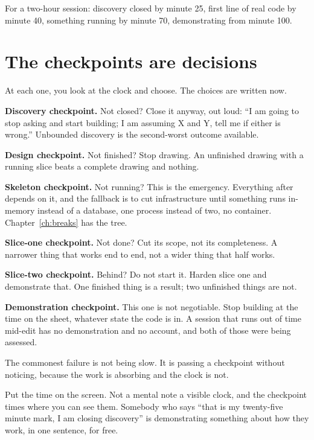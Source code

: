For a two-hour session: discovery closed by minute 25, first line of real code
by minute 40, something running by minute 70, demonstrating from minute 100.

\section{The checkpoints are decisions}

At each one, you look at the clock and choose. The choices are written now.

\begin{kitmethod}
\textbf{Discovery checkpoint.} Not closed? Close it anyway, out loud: ``I am
going to stop asking and start building; I am assuming X and Y, tell me if
either is wrong.'' Unbounded discovery is the second-worst outcome available.

\textbf{Design checkpoint.} Not finished? Stop drawing. An unfinished drawing
with a running slice beats a complete drawing and nothing.

\textbf{Skeleton checkpoint.} Not running? This is the emergency. Everything
after depends on it, and the fallback is to cut infrastructure until something
runs \dash{} in-memory instead of a database, one process instead of two, no
container. Chapter~\ref{ch:breaks} has the tree.

\textbf{Slice-one checkpoint.} Not done? Cut its scope, not its completeness.
A narrower thing that works end to end, not a wider thing that half works.

\textbf{Slice-two checkpoint.} Behind? Do not start it. Harden slice one and
demonstrate that. One finished thing is a result; two unfinished things are
not.

\textbf{Demonstration checkpoint.} This one is not negotiable. Stop building
at the time on the sheet, whatever state the code is in. A session that runs
out of time mid-edit has no demonstration and no account, and both of those
were being assessed.
\end{kitmethod}

\begin{kittrap}
The commonest failure is not being slow. It is passing a checkpoint without
noticing, because the work is absorbing and the clock is not.

Put the time on the screen. Not a mental note \dash{} a visible clock, and the
checkpoint times where you can see them. Somebody who says ``that is my
twenty-five minute mark, I am closing discovery'' is demonstrating something
about how they work, in one sentence, for free.
\end{kittrap}

